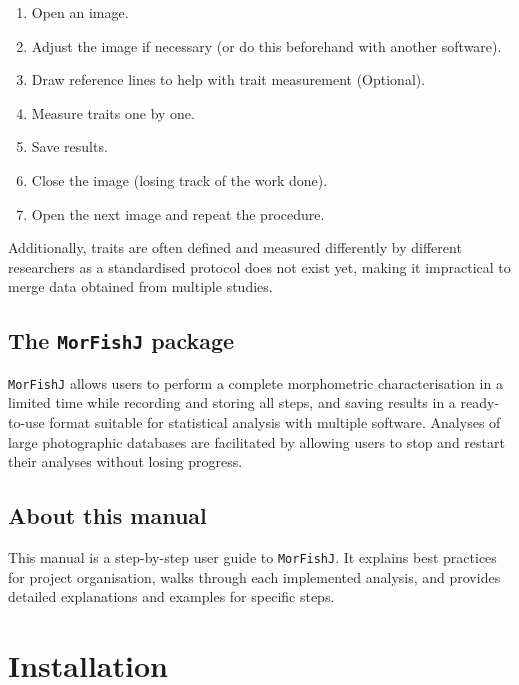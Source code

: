 \documentclass[
  letterpaper,
  DIV=11,
  numbers=noendperiod,
  oneside]{scrreprt}
\providecommand{\tightlist}{%
  \setlength{\itemsep}{0pt}\setlength{\parskip}{0pt}}\usepackage{longtable,booktabs,array}
\begin{document}
\begin{enumerate}
\def\labelenumi{\arabic{enumi}.}
\tightlist
\item
  Open an image.
\item
  Adjust the image if necessary (or do this beforehand with another
  software).
\item
  Draw reference lines to help with trait measurement (Optional).
\item
  Measure traits one by one.
\item
  Save results.
\item
  Close the image (losing track of the work done).
\item
  Open the next image and repeat the procedure.
\end{enumerate}

Additionally, traits are often defined and measured differently by
different researchers as a standardised protocol does not exist yet,
making it impractical to merge data obtained from multiple studies.

\hypertarget{the-morfishj-package}{%
\section*{\texorpdfstring{The \texttt{MorFishJ}
package}{The MorFishJ package}}\label{the-morfishj-package}}

\texttt{MorFishJ} allows users to perform a complete morphometric
characterisation in a limited time while recording and storing all
steps, and saving results in a ready-to-use format suitable for
statistical analysis with multiple software. Analyses of large
photographic databases are facilitated by allowing users to stop and
restart their analyses without losing progress.

\hypertarget{about-this-manual}{%
\section*{About this manual}\label{about-this-manual}}

This manual is a step-by-step user guide to \texttt{MorFishJ}. It
explains best practices for project organisation, walks through each
implemented analysis, and provides detailed explanations and examples
for specific steps.

\hypertarget{installation}{%
\chapter{Installation}\label{installation}}
\end{document}
